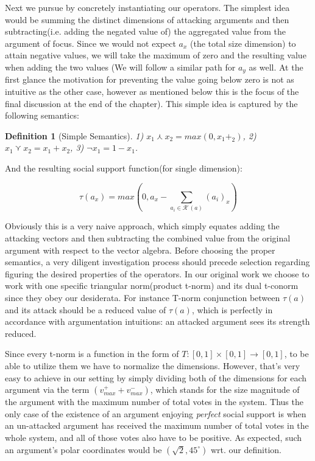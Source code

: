 \documentclass{article}
\newtheorem{definition}{Definition}
\newcommand{\att}{\mathcal{R}}  %
\newcommand{\attackers}[1]{\att^\text{-}\left(#1\right)}
\newcommand{\SAFand}{\curlywedge}     %
\DeclareMathOperator*{\SAFOr}{\bigcurlyvee} %
\begin{document}
 Next we pursue by concretely instantiating our operators. The simplest idea would be summing the distinct dimensions of attacking arguments and then subtracting(i.e. adding the negated value of) the aggregated value from the argument of focus.  Since we would not expect $a_{x}$ (the total size dimension) to attain negative values, we will take the maximum of zero and the resulting value when adding the two values (We will follow a similar path for $a_{y}$ as well. At the first glance the motivation for preventing the value going below zero is not as intuitive as the other case, however as mentioned below this is the focus of the final discussion at the end of the chapter). This simple idea is captured by the following semantics:

\begin{definition} [Simple Semantics]
 1) $x_{1}\curlywedge
x_{2}=max(0, x_{1} +_{2})$, 2) $x_{1}\curlyvee x_{2}=x_{1}+x_{2}$, 3) $\lnot x_{1}=1-x_{1}$.
\end{definition}

And the resulting social support function(for single dimension):

$$\displaystyle \tau(a_x) =   max (0, a_{x} - \sum_{a_i \in \attackers{a}}^{} (a_{i})_{x}   ) $$%


 Obviously this is a very naive approach, which simply equates adding the attacking vectors and then subtracting the combined value from the original argument with respect to the vector algebra. Before choosing the proper semantics, a very diligent investigation process should precede selection regarding figuring the desired properties of the operators. In our original work we choose to work with one specific triangular norm(product t-norm) and its dual t-conorm since they obey our desiderata. For instance T-norm conjunction between $\tau(a)$ and its attack should be a reduced value of $\tau(a)$, which is perfectly in accordance with argumentation intuitions: an attacked argument sees its strength reduced. 

Since every t-norm is a function in the form of $T: [0, 1] \times [0, 1] \rightarrow [0, 1] $, to be able to utilize them we have to normalize the dimensions. However, that's very easy to achieve in our setting by simply dividing both of the dimensions for each argument via the term $(v^{+}_{max} + v^{-}_{max})$, which stands for the size magnitude of the argument with the maximum number of total votes in the system. Thus the only case of the existence of an argument enjoying \textit{perfect} social support is when an un-attacked argument has received the maximum number of total votes in the whole system, and all of those votes also have to be positive. As expected, such an argument's polar coordinates would be $(\sqrt 2, 45^{\circ})$ wrt. our definition.
\end{document}
